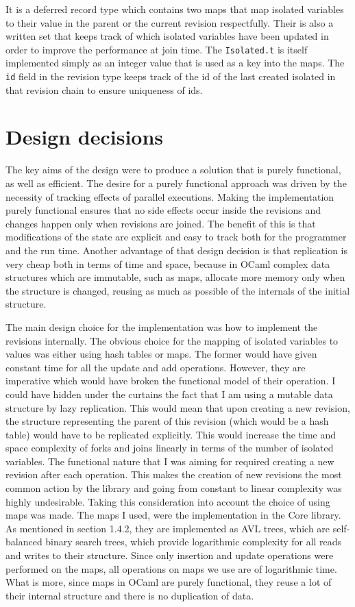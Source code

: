 \documentclass[12pt,twoside,notitlepage]{report}
\begin{document}
It is a deferred record type which contains two maps that map isolated variables to their value in the parent or the current revision respectfully. Their is also a written set that keeps track of which isolated variables have been updated in order to improve the performance at join time. The {\tt Isolated.t} is itself implemented simply as an integer value that is used as a key into the maps. The {\tt id} field in the revision type keeps track of the id of the last created isolated in that revision chain to ensure uniqueness of ids.    

\section{Design decisions}

The key aims of the design were to produce a solution that is purely functional, as well as efficient. The desire for a purely functional approach was driven by the necessity of tracking effects of parallel executions. Making the implementation purely functional ensures that no side effects occur inside the revisions and changes happen only when revisions are joined. The benefit of this is that modifications of the state are explicit and easy to track both for the programmer and the run time. Another advantage of that design decision is that replication is very cheap both in terms of time and space, because in OCaml complex data structures which are immutable, such as maps, allocate more memory only when the structure is changed, reusing as much as possible of the internals of the initial structure.

The main design choice for the implementation was how to implement the revisions internally. The obvious choice for the mapping of isolated variables to values was either using hash tables or maps. The former would have given constant time for all the update and add operations. However, they are imperative which would have broken the functional model of their operation. I could have hidden under the curtains the fact that I am using a mutable data structure by lazy replication. This would mean that upon creating a new revision, the structure representing the parent of this revision (which would be a hash table) would have to be replicated explicitly. This would increase the time and space complexity of forks and joins linearly in terms of the number of isolated variables. The functional nature that I was aiming for required creating a new revision after each operation. This makes the creation of new revisions the most common action by the library and going from constant to linear complexity was highly undesirable. Taking this consideration into account the choice of using maps was made. The maps I used, were the implementation in the Core library. As mentioned in section 1.4.2, they are implemented as AVL trees, which are self-balanced binary search trees, which provide logarithmic complexity for all reads and writes to their structure. Since only insertion and update operations were performed on the maps, all operations on maps we use are of logarithmic time. What is more, since maps in OCaml are purely functional, they reuse a lot of their internal structure and there is no duplication of data. 
\end{document}
